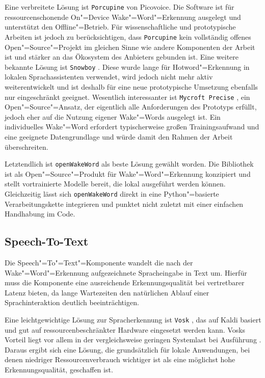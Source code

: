 Eine verbreitete Lösung ist \texttt{Porcupine} \autocite{Porcupine-Documentation} von Picovoice. Die Software ist für ressourcenschonende On"=Device Wake"=Word"=Erkennung ausgelegt und unterstützt den Offline"=Betrieb. Für wissenschaftliche und prototypische Arbeiten ist jedoch zu berücksichtigen, dass \texttt{Porcupine} kein vollständig offenes Open"=Source"=Projekt im gleichen Sinne wie andere Komponenten der Arbeit ist und stärker an das Ökosystem des Anbieters gebunden ist. Eine weitere bekannte Lösung ist \texttt{Snowboy} \autocite{Snowboy-Documentation}. Diese wurde lange für Hotword"=Erkennung in lokalen Sprachassistenten verwendet, wird jedoch nicht mehr aktiv weiterentwickelt und ist deshalb für eine neue prototypische Umsetzung ebenfalls nur eingeschränkt geeignet. Wesentlich interessanter ist \texttt{Mycroft Precise} \autocite{Mycroftprecise-Documentation}, ein Open"=Source"=Ansatz, der eigentlich alle Anforderungen des Prototyps erfüllt, jedoch eher auf die Nutzung eigener Wake"=Words ausgelegt ist. Ein individuelles Wake"=Word erfordert typischerweise großen Trainingsaufwand und eine geeignete Datengrundlage und würde damit den Rahmen der Arbeit überschreiten.

Letztendlich ist \texttt{openWakeWord} \autocite{OpenWakeWord-Documentation} als beste Lösung gewählt worden. Die Bibliothek ist als Open"=Source"=Produkt für Wake"=Word"=Erkennung konzipiert und stellt vortrainierte Modelle bereit, die lokal ausgeführt werden können. Gleichzeitig lässt sich \texttt{openWakeWord} direkt in eine Python"=basierte Verarbeitungskette integrieren und punktet nicht zuletzt mit einer einfachen Handhabung im Code.


\subsection{Speech-To-Text}
\label{subsec:Speech_To_Text}
Die Speech"=To"=Text"=Komponente wandelt die nach der Wake"=Word"=Erkennung aufgezeichnete Spracheingabe in Text um. Hierfür muss die Komponente eine ausreichende Erkennungsqualität bei vertretbarer Latenz bieten, da lange Wartezeiten den natürlichen Ablauf einer Sprachinteraktion deutlich beeinträchtigen.

Eine leichtgewichtige Lösung zur Spracherkennung ist \texttt{Vosk} \autocite{Vosk-Documentation}, das auf Kaldi basiert und gut auf ressourcenbeschränkter Hardware eingesetzt werden kann. Vosks Vorteil liegt vor allem in der vergleichsweise geringen Systemlast bei Ausführung \autocite{Vosk-Documentation}. Daraus ergibt sich eine Lösung, die grundsätzlich für lokale Anwendungen, bei denen niedriger Ressourcenverbrauch wichtiger ist als eine möglichst hohe Erkennungsqualität, geschaffen ist.

